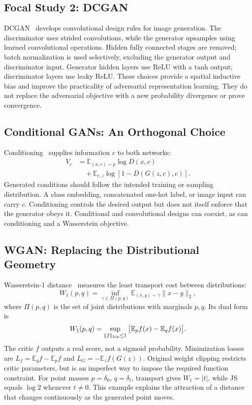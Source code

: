 \documentclass[conference]{IEEEtran}
\newcommand{\E}{\mathbb{E}}
\begin{document}
\subsection{Focal Study 2: DCGAN}
DCGAN~\cite{dcgan} develops convolutional design rules for image generation. The discriminator uses strided convolutions, while the generator upsamples using learned convolutional operations. Hidden fully connected stages are removed; batch normalization is used selectively, excluding the generator output and discriminator input. Generator hidden layers use ReLU with a tanh output; discriminator layers use leaky ReLU. These choices provide a spatial inductive bias and improve the practicality of adversarial representation learning. They do not replace the adversarial objective with a new probability divergence or prove convergence.

\subsection{Conditional GANs: An Orthogonal Choice}
Conditioning~\cite{cgan} supplies information $c$ to both networks:
\begin{align}
V_c&=\E_{(x,c)\sim p}\log D(x,c)\nonumber\\
&\quad+\E_{c,z}\log[1-D(G(z,c),c)].
\end{align}
Generated conditions should follow the intended training or sampling distribution. A class embedding, concatenated one-hot label, or image input can carry $c$. Conditioning controls the desired output but does not itself enforce that the generator obeys it. Conditional and convolutional designs can coexist, as can conditioning and a Wasserstein objective.

\subsection{WGAN: Replacing the Distributional Geometry}
Wasserstein-1 distance~\cite{wgan} measures the least transport cost between distributions:
\begin{equation}
W_1(p,q)=\inf_{\gamma\in\Pi(p,q)}\E_{(x,y)\sim\gamma}\|x-y\|_2,
\end{equation}
where $\Pi(p,q)$ is the set of joint distributions with marginals $p,q$. Its dual form is
\begin{equation}
W_1(p,q)=\sup_{\|f\|_{\rm Lip}\leq1}\big[\E_p f(x)-\E_q f(x)\big].
\end{equation}
The critic $f$ outputs a real score, not a sigmoid probability. Minimization losses are $L_f=\E_q f-\E_p f$ and $L_G=-\E_z f(G(z))$. Original weight clipping restricts critic parameters, but is an imperfect way to impose the required function constraint. For point masses $p=\delta_0$, $q=\delta_t$, transport gives $W_1=|t|$, while JS equals $\log2$ whenever $t\ne0$. This example explains the attraction of a distance that changes continuously as the generated point moves.
\end{document}
